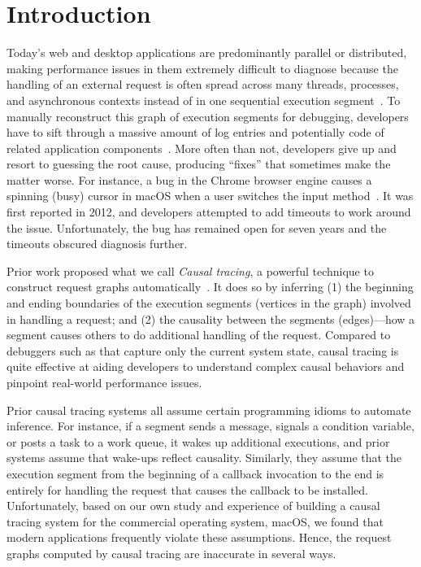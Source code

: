 \section{Introduction} \label{sec:intro}

Today's web and desktop applications are predominantly parallel or distributed,
making performance issues in them extremely difficult to diagnose because the
handling of an external request is often spread across many threads, processes,
and asynchronous contexts instead of in one sequential execution
segment~\cite{harter2012file}. To manually reconstruct this graph of execution
segments for debugging, developers have to sift through a massive amount of log
entries and potentially code of related application
components~\cite{chen2002pinpoint, zhao2016non, xu2009detecting,
nagaraj2012structured, yuan2012conservative}. More often than not, developers
give up and resort to guessing the root cause, producing ``fixes'' that
sometimes make the matter worse. For instance, a bug in the Chrome browser
engine causes a spinning (busy) cursor in macOS when a user switches the input
method~\cite{chromiumbugreport}. It was first reported in 2012, and developers
attempted to add timeouts to work around the issue. Unfortunately, the bug has
remained open for seven years and the timeouts obscured diagnosis further.

Prior work proposed what we call \emph{Causal tracing}, a powerful technique to
construct request graphs automatically~\cite{reynolds2006pip, fonseca2007x,
benjamin2010dapper, zhang2013panappticon, ravindranath2012appinsight}.  It does
so by inferring (1) the beginning and ending boundaries of the execution
segments (vertices in the graph) involved in handling a request; and (2) the
causality between the segments (edges)---how a segment causes others to do
additional handling of the request.  Compared to debuggers such as \spindump
that capture only the current system state, causal tracing is quite effective
at aiding developers to understand complex causal behaviors and pinpoint
real-world performance issues.

Prior causal tracing systems all assume certain programming idioms to automate
inference. For instance, if a segment sends a message, signals a condition
variable, or posts a task to a work queue, it wakes up additional executions,
and prior systems assume that wake-ups reflect causality. Similarly, they
assume that the execution segment from the beginning of a callback invocation
to the end is entirely for handling the request that causes the callback to be
installed.  Unfortunately, based on our own study and experience of building a
causal tracing system for the commercial operating system, macOS, we found that
modern applications frequently violate these assumptions. Hence, the request
graphs computed by causal tracing are inaccurate in several ways.

